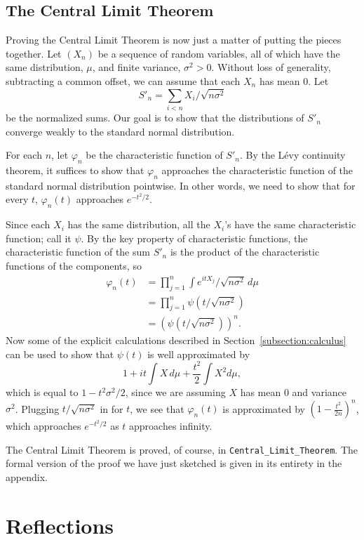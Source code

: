 \documentclass{svjour3}
\newcommand{\ph}{\varphi}
\begin{document}
\subsection{The Central Limit Theorem}

Proving the Central Limit Theorem is now just a matter of putting the pieces together. Let $(X_n)$ be a sequence of random variables, all of which have the same distribution, $\mu$, and finite variance, $\sigma^2 > 0$. Without loss of generality, subtracting a common offset, we can assume that each $X_n$ has mean $0$. Let
\[
 S'_n = \sum_{i < n} X_i / \sqrt {n \sigma^2}
\]
be the normalized sums. Our goal is to show that the distributions of $S'_n$ converge weakly to the standard normal distribution. 

For each $n$, let $\ph_n$ be the characteristic function of $S'_n$. By the L\'evy continuity theorem, it suffices to show that $\ph_n$ approaches the characteristic function of the standard normal distribution pointwise. In other words, we need to show that for every $t$, $\ph_n(t)$ approaches $e^{-t^2/2}$.

Since each $X_i$ has the same distribution, all the $X_i$'s have the same characteristic function; call it $\psi$. By the key property of characteristic functions, the characteristic function of the sum $S'_n$ is the product of the characteristic functions of the components, so
\begin{align*}
 \ph_n(t) & = \prod_{j = 1}^n \int e^{itX_j} / \sqrt{n \sigma^2} \, d\mu \\
   & = \prod_{j = 1}^n \psi(t / \sqrt{n \sigma^2}) \\
   & = (\psi(t / \sqrt{n \sigma^2}))^n.
\end{align*}
Now some of the explicit calculations described in Section~\ref{subsection:calculus} can be used to show that $\psi(t)$ is well approximated by
\[
1 + it \int X \, d\mu + \frac{t^2}{2} \int X^2 d\mu, 
\]
which is equal to $1 - t^2\sigma^2 / 2$, since we are assuming $X$ has mean $0$ and variance $\sigma^2$. Plugging $t / \sqrt{n \sigma^2}$ in for $t$, we see that $\ph_n(t)$ is approximated by $(1 - \frac{t^2}{2n})^n$, which approaches $e^{-t^2/2}$ as $t$ approaches infinity.

The Central Limit Theorem is proved, of course, in \verb=Central_Limit_Theorem=. The formal version of the proof we have just sketched is given in its entirety in the appendix. 

\section{Reflections}
\label{section:reflections}
\end{document}
